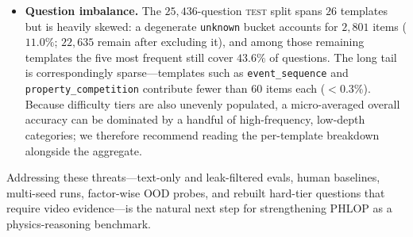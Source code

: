 \documentclass[conference]{IEEEtran}
\begin{document}
\begin{itemize}
    \item \textbf{Question imbalance.}
    The $25{,}436$-question \textsc{test} split spans $26$ templates but is heavily skewed: a degenerate \texttt{unknown} bucket accounts for $2{,}801$ items ($11.0\%$; $22{,}635$ remain after excluding it), and among those remaining templates the five most frequent still cover $43.6\%$ of questions. The long tail is correspondingly sparse---templates such as \texttt{event\_sequence} and \texttt{property\_competition} contribute fewer than $60$ items each ($<0.3\%$). Because difficulty tiers are also unevenly populated, a micro-averaged overall accuracy can be dominated by a handful of high-frequency, low-depth categories; we therefore recommend reading the per-template breakdown alongside the aggregate.
\end{itemize}

Addressing these threats---text-only and leak-filtered evals, human baselines, multi-seed runs, factor-wise OOD probes, and rebuilt hard-tier questions that require video evidence---is the natural next step for strengthening PHLOP as a physics-reasoning benchmark.











\end{document}
